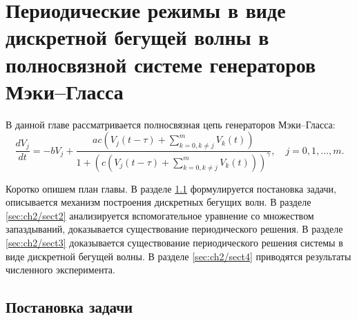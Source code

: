 \chapter{Периодические режимы в виде дискретной бегущей волны в полносвязной системе генераторов Мэки--Гласса}\label{ch:ch2}

В данной главе рассматривается полносвязная цепь генераторов Мэки--Гласса:
\small
\begin{equation}
	\label{eq:system_full_generators}
	\dfrac{d V_{j}}{dt}=- bV_{j} + \dfrac{ac\left(V_{j}(t - \tau) + \sum\limits_{k = 0, k\neq j}^{m}V_{k}(t)\right)}{1 + \left(c\left(V_{j}(t - \tau) + \sum\limits_{k = 0, k\neq j}^{m}V_{k}(t)\right)\right)^{\gamma}}, \quad j=0,1,\ldots,m.
\end{equation}
\normalsize

Коротко опишем план главы. В разделе \ref{sec:ch2/sect1} формулируется постановка задачи, описывается механизм построения дискретных бегущих волн. В разделе \ref{sec:ch2/sect2} анализируется вспомогательное уравнение со множеством запаздываний, доказывается существование периодического решения. В разделе \ref{sec:ch2/sect3} доказывается существование периодического решения системы в виде дискретной бегущей волны. В разделе \ref{sec:ch2/sect4} приводятся результаты численного эксперимента.

\section{Постановка задачи}\label{sec:ch2/sect1}

